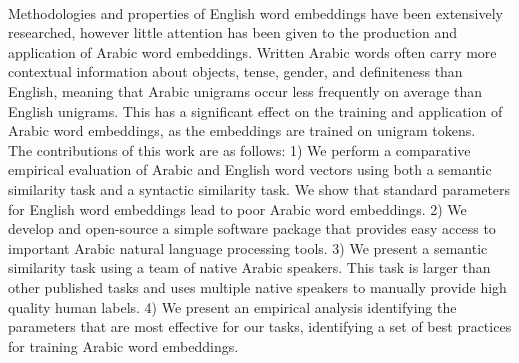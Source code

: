 \\
Methodologies and properties of English word embeddings have been extensively researched, however little attention has been given to the production and application of Arabic word embeddings. Written Arabic words often carry more contextual information about objects, tense, gender, and definiteness than English, meaning that Arabic unigrams occur less frequently on average than English unigrams. This has a significant effect on the training and application of Arabic word embeddings, as the embeddings are trained on unigram tokens.
\\
The contributions of this work are as follows: 1) We perform a comparative empirical evaluation of Arabic and English word vectors using both a semantic similarity task and a syntactic similarity task. We show that standard parameters for English word embeddings lead to poor Arabic word embeddings. 2) We develop and open-source a simple software package that provides easy access to important Arabic natural language processing tools. 3) We present a semantic similarity task using a team of native Arabic speakers. This task is larger than other published tasks and uses multiple native speakers to manually provide high quality human labels. 4) We present an empirical analysis identifying the parameters that are most effective for our tasks, identifying a set of best practices for training Arabic word embeddings.